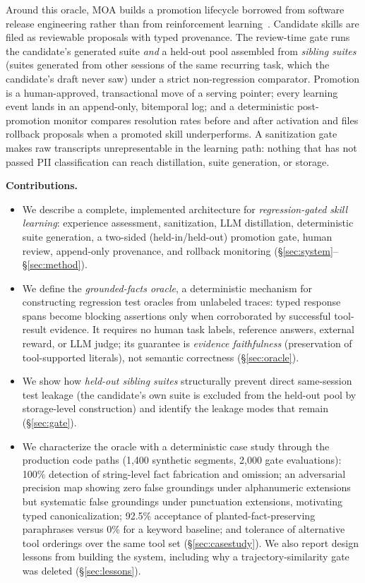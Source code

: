 \documentclass{article}
\newcommand{\moa}{MOA}
\begin{document}
Around this oracle, \moa{} builds a promotion lifecycle borrowed from software release engineering rather than from reinforcement learning~\citep{breck2017mltestscore, sculley2015hidden}. Candidate skills are filed as reviewable proposals with typed provenance. The review-time gate runs the candidate's generated suite \emph{and} a held-out pool assembled from \emph{sibling suites} (suites generated from other sessions of the same recurring task, which the candidate's draft never saw) under a strict non-regression comparator. Promotion is a human-approved, transactional move of a serving pointer; every learning event lands in an append-only, bitemporal log; and a deterministic post-promotion monitor compares resolution rates before and after activation and files rollback proposals when a promoted skill underperforms. A sanitization gate makes raw transcripts unrepresentable in the learning path: nothing that has not passed PII classification can reach distillation, suite generation, or storage.

\textbf{Contributions.}
\begin{itemize}[leftmargin=1.4em, itemsep=1pt, topsep=2pt]
    \item We describe a complete, implemented architecture for \emph{regression-gated skill learning}: experience assessment, sanitization, LLM distillation, deterministic suite generation, a two-sided (held-in/held-out) promotion gate, human review, append-only provenance, and rollback monitoring (\S\ref{sec:system}--\S\ref{sec:method}).
    \item We define the \emph{grounded-facts oracle}, a deterministic mechanism for constructing regression test oracles from unlabeled traces: typed response spans become blocking assertions only when corroborated by successful tool-result evidence. It requires no human task labels, reference answers, external reward, or LLM judge; its guarantee is \emph{evidence faithfulness} (preservation of tool-supported literals), not semantic correctness (\S\ref{sec:oracle}).
    \item We show how \emph{held-out sibling suites} structurally prevent direct same-session test leakage (the candidate's own suite is excluded from the held-out pool by storage-level construction) and identify the leakage modes that remain (\S\ref{sec:gate}).
    \item We characterize the oracle with a deterministic case study through the production code paths (1{,}400 synthetic segments, 2{,}000 gate evaluations): 100\% detection of string-level fact fabrication and omission; an adversarial precision map showing zero false groundings under alphanumeric extensions but systematic false groundings under punctuation extensions, motivating typed canonicalization; 92.5\% acceptance of planted-fact-preserving paraphrases versus 0\% for a keyword baseline; and tolerance of alternative tool orderings over the same tool set (\S\ref{sec:casestudy}). We also report design lessons from building the system, including why a trajectory-similarity gate was deleted (\S\ref{sec:lessons}).
\end{itemize}
\end{document}
